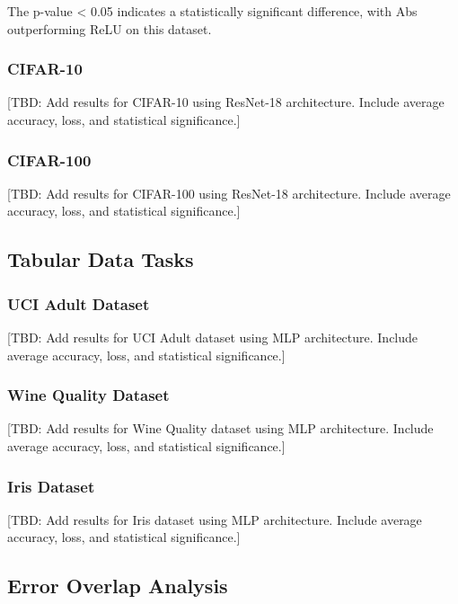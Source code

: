 \documentclass[11pt]{article}
\begin{document}
The p-value < 0.05 indicates a statistically significant difference, with Abs outperforming ReLU on this dataset.

\subsubsection{CIFAR-10}

[TBD: Add results for CIFAR-10 using ResNet-18 architecture. Include average accuracy, loss, and statistical significance.]

\subsubsection{CIFAR-100}

[TBD: Add results for CIFAR-100 using ResNet-18 architecture. Include average accuracy, loss, and statistical significance.]

\subsection{Tabular Data Tasks}

\subsubsection{UCI Adult Dataset}

[TBD: Add results for UCI Adult dataset using MLP architecture. Include average accuracy, loss, and statistical significance.]

\subsubsection{Wine Quality Dataset}

[TBD: Add results for Wine Quality dataset using MLP architecture. Include average accuracy, loss, and statistical significance.]

\subsubsection{Iris Dataset}

[TBD: Add results for Iris dataset using MLP architecture. Include average accuracy, loss, and statistical significance.]

\subsection{Error Overlap Analysis}
\end{document}
